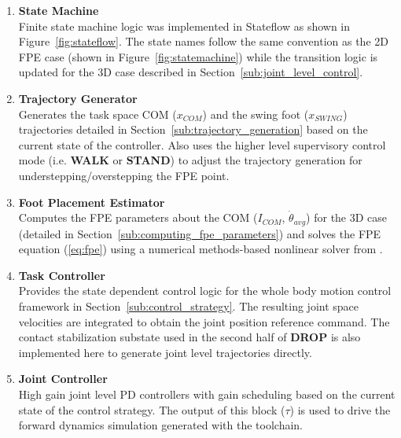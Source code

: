 \begin{enumerate}
	\item \textbf{State Machine} \\ 
	Finite state machine logic was implemented in Stateflow as shown in Figure~\ref{fig:stateflow}. The state names follow the same convention as the 2D FPE case (shown in Figure~\ref{fig:statemachine}) while the transition logic is updated for the 3D case described in Section~\ref{sub:joint_level_control}.  \\

	\item \textbf{Trajectory Generator} \\ 
	Generates the task space COM ($x_{COM}$) and the swing foot ($x_{SWING}$) trajectories detailed in Section~\ref{sub:trajectory_generation} based on the current state of the controller. Also uses the higher level supervisory control mode (i.e. \textbf{WALK} or \textbf{STAND}) to adjust the trajectory generation for understepping/overstepping the FPE point. \\

	\item \textbf{Foot Placement Estimator} \\ 
	Computes the FPE parameters about the COM ($I_{COM}$, $\dot{\theta}_{avg}$) for the 3D case (detailed in Section~\ref{sub:computing_fpe_parameters}) and solves the FPE equation (\ref{eq:fpe}) using a numerical methods-based nonlinear solver from \cite{Wight:2008vt}. \\

	\item \textbf{Task Controller} \\ 
	Provides the state dependent control logic for the whole body motion control framework in Section~\ref{sub:control_strategy}. The resulting joint space velocities are integrated to obtain the joint position reference command. The contact stabilization substate used in the second half of \textbf{DROP} is also implemented here to generate joint level trajectories directly. \\

	\item \textbf{Joint Controller} \\ 
	High gain joint level PD controllers with gain scheduling based on the current state of the control strategy. The output of this block ($\tau$) is used to drive the forward dynamics simulation generated with the toolchain. \\

\end{enumerate}

